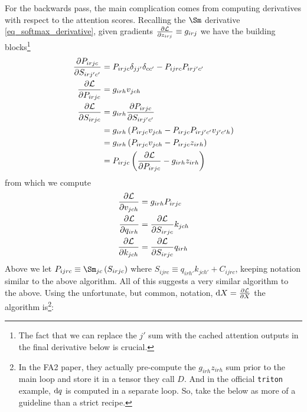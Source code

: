 For the backwards pass, the main complication comes from computing derivatives with respect to the
attention scores. Recalling the $ \Sm $ derivative \eqref{eq_softmax_derivative}, given gradients $
\frac{\partial \mathcal{L}   }{ \partial z _{ irj } } \equiv  g _{ irj } $ we have the building
blocks\footnote{The fact that we can replace the  $ j' $ sum with the cached attention outputs in
the final derivative below is crucial.}
\begin{align}
    \frac{ \partial P _{ irjc } }{ \partial S _{ irj'c' } } &= P _{ irjc}\delta _{ jj' }\delta _{ c c'} - P _{ ijrc } P _{ irj'c' } \nonumber\\
    \frac{ \partial \mathcal{L} }{ \partial P _{ irjc } } &= g _{ irh } v _{ jch }  \nonumber\\
    \frac{ \partial \mathcal{L} }{ \partial S _{ irjc } } &= g _{ irh } \frac{ \partial P _{ irjc } }{ \partial S _{ irj'c' } }\nonumber\\
                                                    &= g _{ irh } \left ( P _{ irjc } v _{ jch } - P _{ irjc } P _{ ir j'c' } v _{ j'c'h }  \right )  \nonumber\\
                                                    &= g _{ irh } \left ( P _{ irjc } v _{ jch } - P _{ irjc }  z _{irh }  \right )\nonumber\\
                                                    &= P _{ irjc }\left(\frac{ \partial \mathcal{L} }{ \partial P _{ irjc } }  -g _{ irh }   z _{irh } \right)\label{eq_fa2_derivative_building_blocks}
\end{align}
from which we compute
\begin{align}
    \frac{ \partial \mathcal{L} }{ \partial v _{ jch } } &= g _{ irh } P _{ irjc }  \nonumber\\
    \frac{ \partial \mathcal{L} }{ \partial q _{ irh } } &=  \frac{ \partial \mathcal{L} }{ \partial S _{ irjc } }k _{ jch } \nonumber\\
    \frac{ \partial \mathcal{L} }{ \partial k _{ jch } } &=  \frac{ \partial \mathcal{L} }{ \partial S _{ irjc } }q _{ irh }
\end{align}
Above we let $ P _{ ijrc } \equiv \Sm _{ jc}\left ( S _{ irjc } \right ) $ where $ S _{ ijrc }
\equiv   q _{ irh' } k _{ jch' } + C _{ ijrc }$, keeping notation similar to the above
algorithm. All of this suggests a very similar algorithm to the above. Using the unfortunate, but
common, notation,  $ {\rm d} X =  \frac{ \partial \mathcal{L}  }{ \partial X  } $ the algorithm is\footnote{In
the FA2 paper, they actually pre-compute the $ g _{ irh } z _{ irh } $  sum prior to the main loop
and store it in a tensor they call $ D $. And in the official \texttt{triton} example, $ {\rm d} q $ is
computed in a separate loop. So, take the below as more of a guideline than a strict recipe.}:


